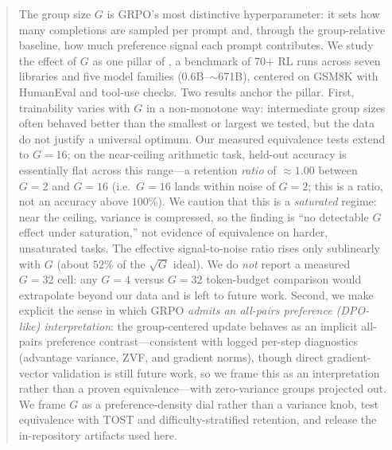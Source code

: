 \begin{abstract}
The group size $G$ is GRPO's most distinctive hyperparameter: it sets how many
completions are sampled per prompt and, through the group-relative baseline, how
much preference signal each prompt contributes. We study the effect of $G$ as one
pillar of \ours{}, a benchmark of 70+ RL runs across seven libraries and
five model families ($0.6$B--$\sim$671B), centered on GSM8K with HumanEval and
tool-use checks. Two results
anchor the pillar. First, trainability varies with $G$ in a non-monotone way:
intermediate group sizes often behaved better than the smallest or largest we
tested, but the data do not justify a universal optimum. Our measured equivalence
tests extend to $G{=}16$; on the near-ceiling arithmetic task, held-out accuracy
is essentially flat across this range---a retention \emph{ratio} of ${\approx}1.00$
between $G{=}2$ and $G{=}16$ (i.e.\ $G{=}16$ lands within noise of $G{=}2$; this is
a ratio, not an accuracy above $100\%$). We caution that this is a \emph{saturated}
regime: near the ceiling, variance is compressed, so the finding is ``no detectable
$G$ effect under saturation,'' not evidence of equivalence on harder, unsaturated
tasks. The effective signal-to-noise ratio
rises only sublinearly with $G$ (about $52\%$ of the $\sqrt{G}$ ideal). We do
\emph{not} report a measured $G{=}32$ cell: any $G{=}4$ versus $G{=}32$
token-budget comparison would extrapolate beyond our data and is left to future work. Second, we make explicit the sense in which GRPO
\emph{admits an all-pairs preference (DPO-like) interpretation}: the group-centered
update behaves as an implicit all-pairs preference
contrast---consistent with logged per-step diagnostics (advantage variance,
ZVF, and gradient norms), though direct gradient-vector validation is still future
work, so we frame this as an interpretation rather than a proven equivalence---with zero-variance groups
projected out. We frame $G$ as a preference-density dial rather than a variance
knob, test equivalence with TOST and difficulty-stratified retention, and release
the in-repository artifacts used here.
\end{abstract}
